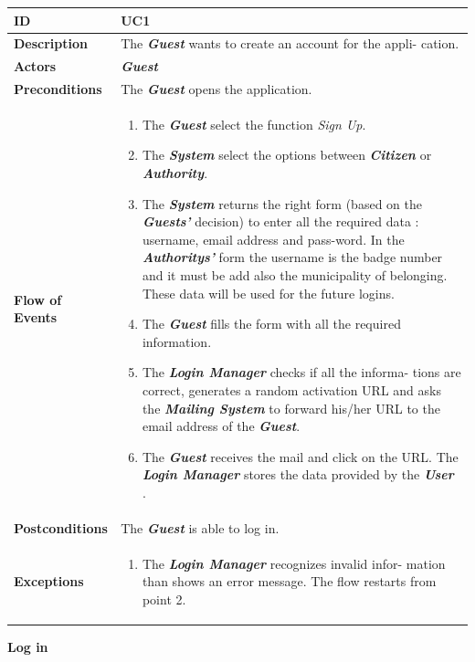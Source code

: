 \documentclass{report}
\begin{document}
\begin{tabularx}{\linewidth}{| l | X |}
	\hline
	\textbf{ID} & UC1\\
	
	\hline
	\textbf{Description} & The \textbf{\textit{Guest}} wants to create an account for the appli-
	cation.\\
	
	\hline
	\textbf{Actors} & \textbf{\textit{Guest}}\\
	
	\hline
	\textbf{Preconditions} & The \textbf{\textit{Guest}} opens the application.\\
	
	\hline
	\textbf{Flow of Events} & \parbox{0.7\textwidth}{\begin{enumerate}
			\item The \textbf{\textit{Guest}} select the function \textit{Sign Up}.
			\item The \textbf{\textit{System}} select the options between \textbf{\textit{Citizen}} or \textbf{\textit{Authority}}.
			\item The \textbf{\textit{System}} returns the right form (based on the \textbf{\textit{Guests'}} decision) to enter all the required data
			: username, email address and pass-word. In the \textbf{\textit{Authoritys'}} form the username is the badge number and it must be add also the municipality of belonging. These data will be used for the future logins.	
			\item The \textbf{\textit{Guest}} fills the form with all the required information.
			\item The \textbf{\textit{Login Manager}} checks if all the informa-
			tions are correct, generates a random activation
			URL and asks the \textbf{\textit{Mailing System}} to forward his/her URL to the email address of the \textbf{\textit{Guest}}.
			\item The \textbf{\textit{Guest}} receives the mail and click on the URL. The \textbf{\textit{Login Manager}} stores the data provided by the \textbf{\textit{User}} .
			
	\end{enumerate}}\\
	
	\hline
	\textbf{Postconditions} & The \textbf{\textit{Guest}} is able to log in.\\
	
	\hline
	\textbf{Exceptions} & \parbox{0.7\textwidth}{ \begin{enumerate}
			\item The \textbf{\textit{Login Manager}} recognizes invalid infor-
			mation than shows an error message. The flow
			restarts from point 2. 
		\end{enumerate}}\\
	
	\hline
	
\end{tabularx}
\begin{center}
	\textbf{Log in}
\end{center}
\end{document}
